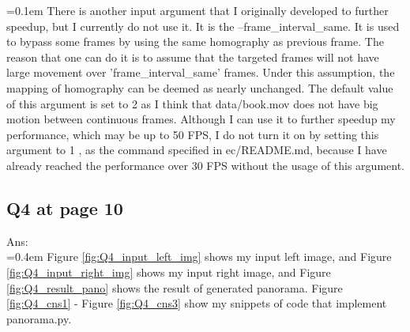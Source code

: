 \documentclass{article}
\begin{document}
	\hangindent=0.1em \hspace{0.1em}There is another input argument that I originally developed to further speedup, but I currently do not use it. It is the --frame\_interval\_same. It is used to bypass some frames by using the same homography as previous frame. The reason that one can do it is to assume that the targeted frames will not have large movement over 'frame\_interval\_same' frames. Under this assumption, the mapping of homography can be deemed as nearly unchanged. The default value of this argument is set to 2 as I think that data/book.mov does not have big motion between continuous frames. Although I can use it to further speedup my performance, which may be up to 50 FPS, I do not turn it on by setting this argument to 1 , as the command specified in ec/README.md, because I have already reached the performance over 30 FPS without the usage of this argument.

	\newpage
	\subsection*{Q4 at page 10}
	Ans:\\
	\hangindent=0.4em \hspace{0.3em} Figure \ref{fig:Q4_input_left_img} shows my input left image, and Figure \ref{fig:Q4_input_right_img} shows my input right image, and Figure \ref{fig:Q4_result_pano} shows the result of generated panorama. Figure \ref{fig:Q4_cns1} - Figure \ref{fig:Q4_cns3} show my snippets of code that implement panorama.py.
\end{document}
